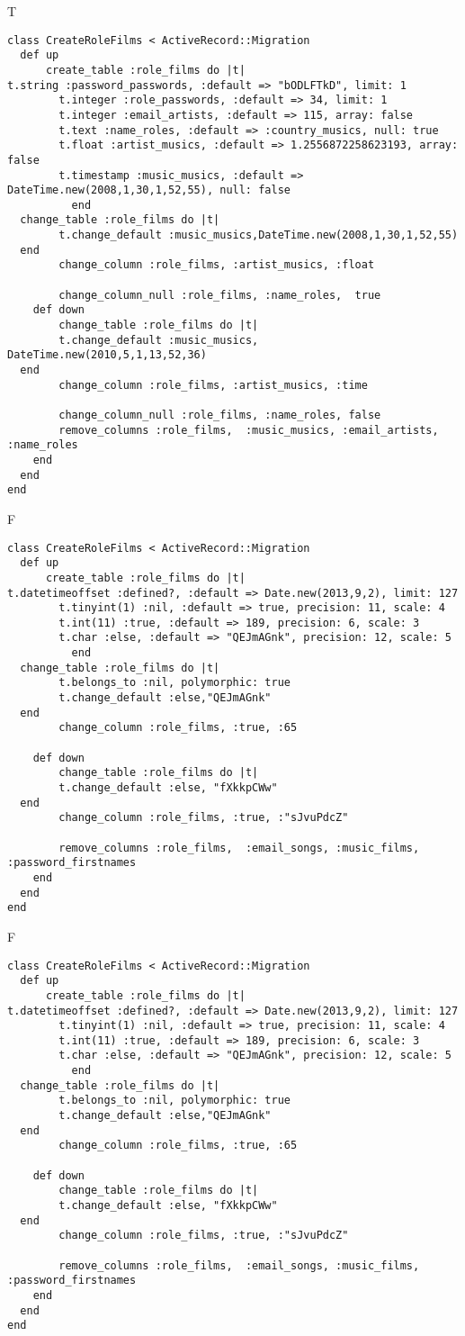 T
\begin{verbatim}
class CreateRoleFilms < ActiveRecord::Migration
  def up
	  create_table :role_films do |t|
t.string :password_passwords, :default => "bODLFTkD", limit: 1
		t.integer :role_passwords, :default => 34, limit: 1
		t.integer :email_artists, :default => 115, array: false
		t.text :name_roles, :default => :country_musics, null: true
		t.float :artist_musics, :default => 1.2556872258623193, array: false
		t.timestamp :music_musics, :default => DateTime.new(2008,1,30,1,52,55), null: false
		  end
  change_table :role_films do |t|
		t.change_default :music_musics,DateTime.new(2008,1,30,1,52,55)
  end
 		change_column :role_films, :artist_musics, :float
   
		change_column_null :role_films, :name_roles,  true
	def down
		change_table :role_films do |t|
		t.change_default :music_musics, DateTime.new(2010,5,1,13,52,36)
  end
 		change_column :role_films, :artist_musics, :time
   
		change_column_null :role_films, :name_roles, false
 		remove_columns :role_films,  :music_musics, :email_artists, :name_roles 
    end 
  end
end

\end{verbatim}

F
\begin{verbatim}
class CreateRoleFilms < ActiveRecord::Migration
  def up
	  create_table :role_films do |t|
t.datetimeoffset :defined?, :default => Date.new(2013,9,2), limit: 127
		t.tinyint(1) :nil, :default => true, precision: 11, scale: 4
		t.int(11) :true, :default => 189, precision: 6, scale: 3
		t.char :else, :default => "QEJmAGnk", precision: 12, scale: 5
		  end
  change_table :role_films do |t|
		t.belongs_to :nil, polymorphic: true
 		t.change_default :else,"QEJmAGnk"
  end
 		change_column :role_films, :true, :65
   
	def down
		change_table :role_films do |t|
		t.change_default :else, "fXkkpCWw"
  end
 		change_column :role_films, :true, :"sJvuPdcZ"
   
		remove_columns :role_films,  :email_songs, :music_films, :password_firstnames 
    end 
  end
end

\end{verbatim}

F
\begin{verbatim}
class CreateRoleFilms < ActiveRecord::Migration
  def up
	  create_table :role_films do |t|
t.datetimeoffset :defined?, :default => Date.new(2013,9,2), limit: 127
		t.tinyint(1) :nil, :default => true, precision: 11, scale: 4
		t.int(11) :true, :default => 189, precision: 6, scale: 3
		t.char :else, :default => "QEJmAGnk", precision: 12, scale: 5
		  end
  change_table :role_films do |t|
		t.belongs_to :nil, polymorphic: true
 		t.change_default :else,"QEJmAGnk"
  end
 		change_column :role_films, :true, :65
   
	def down
		change_table :role_films do |t|
		t.change_default :else, "fXkkpCWw"
  end
 		change_column :role_films, :true, :"sJvuPdcZ"
   
		remove_columns :role_films,  :email_songs, :music_films, :password_firstnames 
    end 
  end
end

\end{verbatim}

